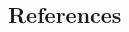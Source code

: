 \documentclass[final]{beamer}\usepackage[]{graphicx}\usepackage[]{color}
\begin{document}
\begin{frame}[fragile]
\begin{multicols}{2}


\section{References}
\renewcommand{\bibname}{\chapter{References}}
\let\oldbibsection\bibsection
\renewcommand{\bibsection}{}





\end{multicols}

\end{frame}
\end{document}
